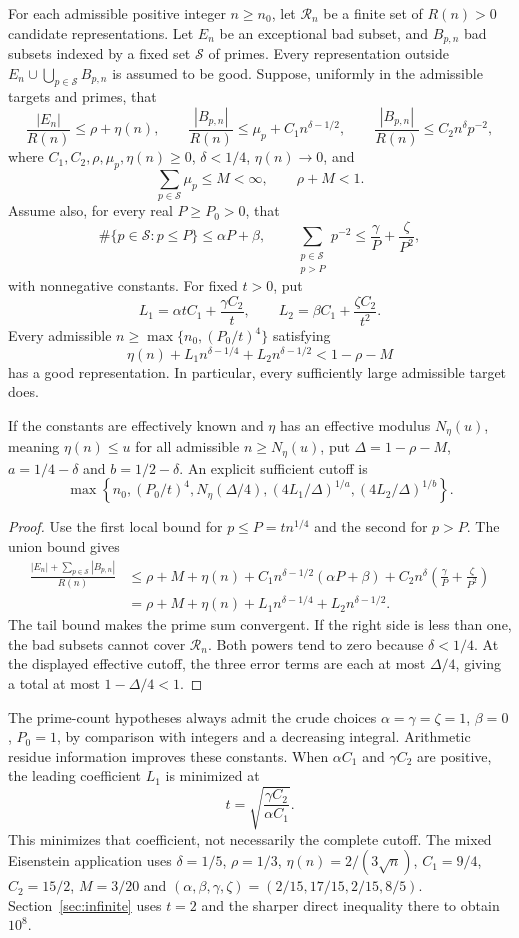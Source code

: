 \begin{proposition}\label{prop:arithmetic-criterion}
For each admissible positive integer $n\ge n_0$, let $\mathcal R_n$ be a finite
set of $R(n)>0$ candidate representations. Let $E_n$ be an exceptional
bad subset, and $B_{p,n}$ bad subsets indexed by a fixed set $\mathcal S$
of primes. Every representation outside
$E_n\cup\bigcup_{p\in\mathcal S}B_{p,n}$ is assumed to be good.
Suppose, uniformly in the admissible targets and primes, that
\[
\frac{|E_n|}{R(n)}\le\rho+\eta(n),\qquad
\frac{|B_{p,n}|}{R(n)}\le\mu_p+C_1n^{\delta-1/2},\qquad
\frac{|B_{p,n}|}{R(n)}\le C_2n^\delta p^{-2},
\]
where $C_1,C_2,\rho,\mu_p,\eta(n)\ge0$, $\delta<1/4$,
$\eta(n)\to0$, and
\[
\sum_{p\in\mathcal S}\mu_p\le M<\infty,\qquad \rho+M<1.
\]
Assume also, for every real $P\ge P_0>0$, that
\[
\#\{p\in\mathcal S:p\le P\}\le\alpha P+\beta,\qquad
\sum_{\substack{p\in\mathcal S\\p>P}}p^{-2}
\le\frac\gamma P+\frac\zeta{P^2},
\]
with nonnegative constants. For fixed $t>0$, put
\[
L_1=\alpha tC_1+\frac{\gamma C_2}{t},\qquad
L_2=\beta C_1+\frac{\zeta C_2}{t^2}.
\]
Every admissible $n\ge\max\{n_0,(P_0/t)^4\}$ satisfying
\[
\eta(n)+L_1n^{\delta-1/4}+L_2n^{\delta-1/2}<1-\rho-M
\]
has a good representation. In particular, every sufficiently large
admissible target does.

If the constants are effectively known and $\eta$ has an effective
modulus $N_\eta(u)$, meaning $\eta(n)\le u$ for all admissible
$n\ge N_\eta(u)$, put $\Delta=1-\rho-M$, $a=1/4-\delta$ and
$b=1/2-\delta$. An explicit sufficient cutoff is
\[
\max\left\{n_0,(P_0/t)^4,N_\eta(\Delta/4),
 (4L_1/\Delta)^{1/a},(4L_2/\Delta)^{1/b}\right\}.
\]
\end{proposition}
\begin{proof}
Use the first local bound for $p\le P=t n^{1/4}$ and the second for
$p>P$. The union bound gives
\begin{align*}
\frac{|E_n|+\sum_{p\in\mathcal S}|B_{p,n}|}{R(n)}
&\le\rho+M+\eta(n)+C_1n^{\delta-1/2}(\alpha P+\beta)
+C_2n^\delta\left(\frac\gamma P+\frac\zeta{P^2}\right)\\
&=\rho+M+\eta(n)+L_1n^{\delta-1/4}+L_2n^{\delta-1/2}.
\end{align*}
The tail bound makes the prime sum convergent. If the right side is
less than one, the bad subsets cannot cover $\mathcal R_n$.
Both powers tend to zero because $\delta<1/4$.
At the displayed effective cutoff, the three error terms are each at
most $\Delta/4$, giving a total at most $1-\Delta/4<1$.
\end{proof}
The prime-count hypotheses always admit the crude choices
$\alpha=\gamma=\zeta=1$, $\beta=0$, $P_0=1$, by comparison with integers
and a decreasing integral. Arithmetic residue information improves these
constants. When $\alpha C_1$ and $\gamma C_2$ are positive, the leading
coefficient $L_1$ is minimized at
\[
t=\sqrt{\frac{\gamma C_2}{\alpha C_1}}.
\]
This minimizes that coefficient, not necessarily the complete cutoff.
The mixed Eisenstein application uses $\delta=1/5$, $\rho=1/3$,
$\eta(n)=2/(3\sqrt n)$, $C_1=9/4$, $C_2=15/2$, $M=3/20$ and
$(\alpha,\beta,\gamma,\zeta)=(2/15,17/15,2/15,8/5)$.
Section~\ref{sec:infinite} uses $t=2$ and the sharper direct inequality
there to obtain $10^8$.

